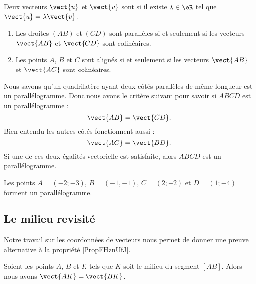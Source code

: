 \begin{definition}
    Deux vecteurs \( \vect{ u }\) et \( \vect{ v }\) sont  si il existe \( \lambda\in \eR\) tel que \( \vect{ u }=\lambda\vect{ v }\).
\end{definition}

\begin{propriete}
    \begin{enumerate}
        \item
            Les droites \( (AB)\) et \( (CD)\) sont parallèles si et seulement si les vecteurs \( \vect{ AB }\) et \( \vect{ CD }\) sont colinéaires.
        \item
            Les points \( A\), \( B\) et \( C\) sont alignés si et seulement si les vecteurs \( \vect{ AB }\) et \( \vect{ AC }\) sont colinéaires.
    \end{enumerate}
\end{propriete}

Nous savons qu'un quadrilatère ayant deux côtés parallèles de même longueur est un parallélogramme. Donc nous avons le critère suivant pour savoir si \( ABCD\) est un parallélogramme :
\begin{equation}
    \vect{ AB }=\vect{ CD }.
\end{equation}
Bien entendu les autres côtés fonctionnent aussi :
\begin{equation}
    \vect{ AC }=\vect{ BD }.
\end{equation}
Si une de ces deux égalités vectorielle est satisfaite, alors \( ABCD\) est un parallélogramme.

\begin{example}
    Les points \( A=(-2;-3)\), \( B=(-1,-1)\), \( C=(2;-2)\) et \( D=(1;-4)\) forment un parallélogramme.
\end{example}

\subsection{Le milieu revisité}

Notre travail sur les coordonnées de vecteurs nous permet de donner une preuve alternative à la propriété \ref{PropFHznUfJ}.

\begin{propriete}
    Soient les points \( A\), \( B\) et \( K\) tels que \( K\) soit le milieu du segment \( [AB]\). Alors nous avons \( \vect{ AK }=\vect{ BK }\).
\end{propriete}

